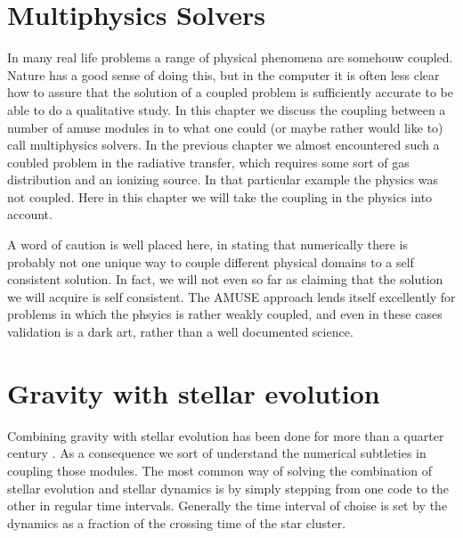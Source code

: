%

        {}

\section{Multiphysics Solvers}\label{Ch:MultiphysicsSolvers:Introduction}

In many real life problems a range of physical phenomena are somehouw
coupled. Nature has a good sense of doing this, but in the computer it
is often less clear how to assure that the solution of a coupled
problem is sufficiently accurate to be able to do a qualitative study.
In this chapter we discuss the coupling between a number of amuse
modules in to what one could (or maybe rather would like to) call
multiphysics solvers. In the previous chapter we almost encountered
such a coubled problem in the radiative transfer, which requires some
sort of gas distribution and an ionizing source. In that particular
example the physics was not coupled. Here in this chapter we will take
the coupling in the physics into account. 

A word of caution is well placed here, in stating that numerically
there is probably not one unique way to couple different physical
domains to a self consistent solution. In fact, we will not even so
far as claiming that the solution we will acquire is self consistent.
The AMUSE approach lends itself excellently for problems in which the
phsyics is rather weakly coupled, and even in these cases validation
is a dark art, rather than a well documented science.

\section{Gravity with stellar evolution}

Combining gravity with stellar evolution has been done for more than a
quarter century \cite{MNRAS.224..193T.193T}.  As a
consequence we sort of understand the numerical subtleties in coupling
those modules.  The most common way of solving the combination of
stellar evolution and stellar dynamics is by simply stepping from one
code to the other in regular time intervals. Generally the time
interval of choise is set by the dynamics as a fraction of the
crossing time of the star cluster. 

